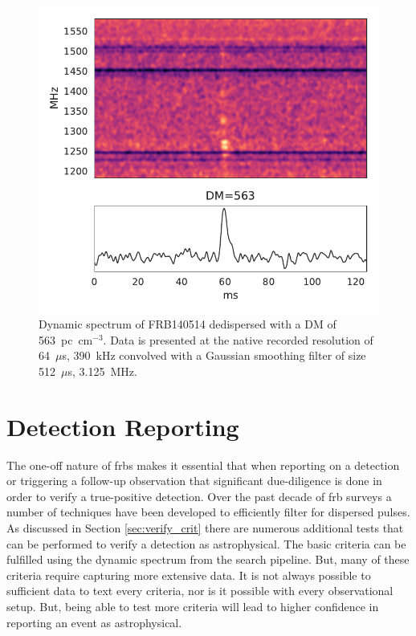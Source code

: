 \documentclass[a4paper,fleqn,usenatbib]{mnras}
\begin{document}
\begin{figure}
    \includegraphics[width=1.0\linewidth]{figures/FRB140514.pdf}
    \caption{Dynamic spectrum of FRB140514 dedispersed with a DM of
    563~pc~cm$^{-3}$.  Data is presented at the native recorded resolution of
    64~$\mu$s, 390~kHz convolved with a Gaussian smoothing filter of size
    512~$\mu$s, 3.125~MHz.
    }
    \label{fig:FRB140514}
\end{figure}

\section{Detection Reporting}
\label{sec:detect_report}

The one-off nature of \glspl{frb} makes it essential that when reporting on a
detection or triggering a follow-up observation that significant due-diligence
is done in order to verify a true-positive detection. Over the past decade of
\gls{frb} surveys a number of techniques have been developed to efficiently
filter for dispersed pulses. As discussed in Section \ref{sec:verify_crit} there
are numerous additional tests that can be performed to verify a detection as
astrophysical. The basic criteria can be fulfilled using the dynamic spectrum
from the search pipeline. But, many of these criteria require capturing more
extensive data. It is not always possible to sufficient data to text every
criteria, nor is it possible with every observational setup. But, being able to
test more criteria will lead to higher confidence in reporting an event as
astrophysical.
\end{document}
